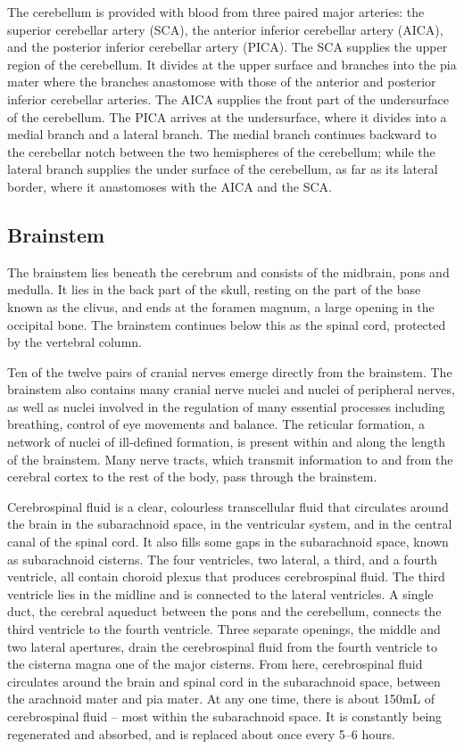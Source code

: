 The cerebellum is provided with blood from three paired major arteries: the superior cerebellar artery (SCA), the anterior inferior cerebellar artery (AICA), and the posterior inferior cerebellar artery (PICA). The SCA supplies the upper region of the cerebellum. It divides at the upper surface and branches into the pia mater where the branches anastomose with those of the anterior and posterior inferior cerebellar arteries. The AICA supplies the front part of the undersurface of the cerebellum. The PICA arrives at the undersurface, where it divides into a medial branch and a lateral branch. The medial branch continues backward to the cerebellar notch between the two hemispheres of the cerebellum; while the lateral branch supplies the under surface of the cerebellum, as far as its lateral border, where it anastomoses with the AICA and the SCA.

\hypertarget{brainstem}{%
\subsection{Brainstem}\label{brainstem}}

The brainstem lies beneath the cerebrum and consists of the midbrain, pons and medulla. It lies in the back part of the skull, resting on the part of the base known as the clivus, and ends at the foramen magnum, a large opening in the occipital bone. The brainstem continues below this as the spinal cord, protected by the vertebral column.

Ten of the twelve pairs of cranial nerves emerge directly from the brainstem. The brainstem also contains many cranial nerve nuclei and nuclei of peripheral nerves, as well as nuclei involved in the regulation of many essential processes including breathing, control of eye movements and balance. The reticular formation, a network of nuclei of ill-defined formation, is present within and along the length of the brainstem. Many nerve tracts, which transmit information to and from the cerebral cortex to the rest of the body, pass through the brainstem.

Cerebrospinal fluid is a clear, colourless transcellular fluid that circulates around the brain in the subarachnoid space, in the ventricular system, and in the central canal of the spinal cord. It also fills some gaps in the subarachnoid space, known as subarachnoid cisterns. The four ventricles, two lateral, a third, and a fourth ventricle, all contain choroid plexus that produces cerebrospinal fluid. The third ventricle lies in the midline and is connected to the lateral ventricles. A single duct, the cerebral aqueduct between the pons and the cerebellum, connects the third ventricle to the fourth ventricle. Three separate openings, the middle and two lateral apertures, drain the cerebrospinal fluid from the fourth ventricle to the cisterna magna one of the major cisterns. From here, cerebrospinal fluid circulates around the brain and spinal cord in the subarachnoid space, between the arachnoid mater and pia mater. At any one time, there is about 150mL of cerebrospinal fluid -- most within the subarachnoid space. It is constantly being regenerated and absorbed, and is replaced about once every 5--6 hours.

